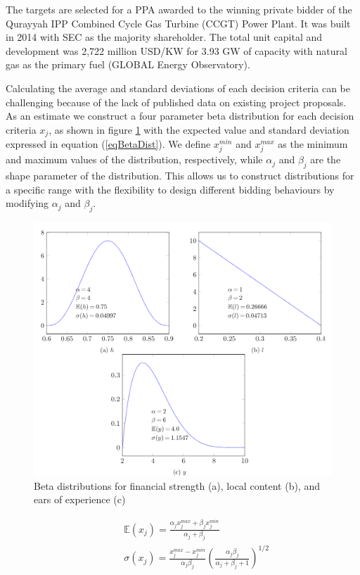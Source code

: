 \documentclass[informs]{informs3}
\begin{document}
The targets are selected for a PPA awarded to the winning private bidder of the Qurayyah IPP Combined Cycle Gas Turbine (CCGT) Power Plant. It was built in 2014 with SEC as the majority shareholder. The total unit capital and development was 2,722 million USD/KW for 3.93 GW of capacity with natural gas as the primary fuel (GLOBAL Energy Observatory).

Calculating the average and standard deviations of each decision criteria can be challenging because of the lack of published data on existing project proposals. As an estimate  we construct a four parameter beta distribution for each decision criteria $x_j$, as shown in figure \ref{figBeta}  with the expected value and standard deviation expressed in equation (\ref{eqBetaDist}). We define $x_j^{min}$ and $x_j^{max}$ as the minimum and maximum values of the distribution, respectively, while $\alpha_j$ and $\beta_j$ are the shape parameter of the distribution. This allows us to construct distributions for  a specific range with the flexibility to design different bidding behaviours by modifying $\alpha_j$ and $\beta_j$.


\begin{figure}
	\centering 
    \includegraphics[scale=1]{figure1.png}
    \caption{Beta distributions for financial strength (a), local content (b), and ears of experience (c)}
    \label{figBeta}
\end{figure}

\begin{subequations} \label{eqBetaDist}
\begin{align}
	&\qquad \mathbb{E}(x_j) = \frac{\alpha_j x_j^{max}+\beta_j x_j^{min}}{\alpha_j+\beta_j}\label{eqBetaAvg}  \\
    &\qquad \sigma(x_j) = \frac{x_j^{max}-x_j^{min}}{\alpha_j\beta_j}\left(\frac{\alpha_j \beta_j}{\alpha_j+\beta_j+1}\right) ^{1/2}\label{eqBetaStd} 
\end{align}
\end{subequations}
\end{document}
